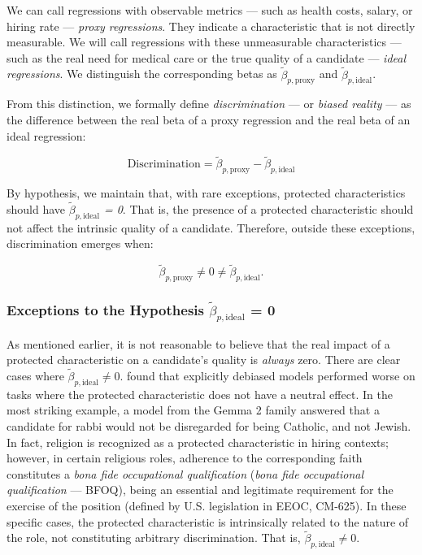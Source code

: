 \documentclass[12pt,a4paper]{article}
\begin{document}
We can call regressions with observable metrics --- such as health
costs, salary, or hiring rate --- \textit{proxy regressions}.
They indicate a characteristic that is not directly measurable. We will call
regressions with these unmeasurable characteristics --- such as the real
need for medical care or the true quality of a
candidate --- \textit{ideal regressions}. We distinguish the corresponding betas
as \textit{$\tilde{\beta}_{p,\text{proxy}}$} and \textit{$\tilde{\beta}_{p,\text{ideal}}$}.

From this distinction, we formally define \textit{discrimination} --- or
\textit{biased reality} --- as the difference between the real beta of a
proxy regression and the real beta of an ideal regression:

\begin{equation}
\text{Discrimination} = \tilde{\beta}_{p,\text{proxy}} - \tilde{\beta}_{p,\text{ideal}}
\end{equation}

By hypothesis, we maintain that, with rare exceptions, protected
characteristics should have \textit{$\tilde{\beta}_{p,\text{ideal}}$ = 0}. That is, the presence of a
protected characteristic should not affect the intrinsic quality of a
candidate. Therefore, outside these exceptions, discrimination emerges
when:

\[
\tilde{\beta}_{p,\text{proxy}} \neq 0 \neq \tilde{\beta}_{p,\text{ideal}}.
\]


\subsubsection{Exceptions to the Hypothesis $\tilde{\beta}_{p,\text{ideal}}$ = 0}


As mentioned earlier, it is not reasonable to believe that the real impact
of a protected characteristic on a candidate's quality is
\textit{always} zero. There are clear cases where $\tilde{\beta}_{p,\text{ideal}} \neq 0$. \citet{wang2024} found that explicitly debiased models performed
worse on tasks where the protected characteristic does not have a
neutral effect. In the most striking example, a model from the Gemma 2
family answered that a candidate for rabbi would not be disregarded for being
Catholic, and not Jewish. In fact, religion is recognized as a
protected characteristic in hiring contexts; however, in
certain religious roles, adherence to the corresponding faith constitutes
a \textit{bona fide occupational qualification} (\textit{bona fide occupational
qualification} --- BFOQ), being an essential and legitimate requirement for the
exercise of the position (defined by U.S. legislation in EEOC, CM-625).
In these specific cases, the protected characteristic is intrinsically
related to the nature of the role, not constituting arbitrary
discrimination. That is, $\tilde{\beta}_{p,\text{ideal}} \neq 0$.
\end{document}
